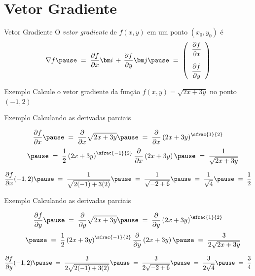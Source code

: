 \section{Vetor Gradiente}

\begin{frame}{Vetor Gradiente}
  O \emph{vetor gradiente} de $f(x, y)$ em um ponto $(x_0, y_0)$
  \pause
  é
  \[
    \nabla f
    \pause
    \;=\; \D{f}{x}\veci \,+\, \D{f}{y}\vecj
    \pause
    \;=\; \left(\begin{array}{c} \D{f}{x} \\[5mm] \D{f}{y} \end{array}\right)
  \]
\end{frame}

\addtocounter{exemplo}{1}
\begin{frame}{Exemplo \theexemplo}
  Calcule o vetor gradiente da função \(f(x, y) = \sqrt{2x+3y}\)
  no ponto \((-1, 2)\)
\end{frame}

\begin{frame}{Exemplo \theexemplo}
  Calculando as derivadas parciais

  \pause
  \[
    \D{f}{x}
    \pause
    \;=\; \D{}{x}\sqrt{2x+3y}
    \pause
    \;=\; \D{}{x}\left(2x+3y\right)^{\sfrac{1}{2}}
  \]
  \[
    \hphantom{\D{f}{x}}
    \pause
    \;=\; \frac{1}{2}\left(2x+3y\right)^{\sfrac{-1}{2}}\D{}{x}\left(2x+3y\right)
    \pause
    \;=\; \frac{1}{\sqrt{2x+3y}}
  \]

  \pause
  \[
    \D{f}{x}(-1, 2)
    \pause
    \;=\; \frac{1}{\sqrt{2(-1)+3(2)}}
    \pause
    \;=\; \frac{1}{\sqrt{-2+6}}
    \pause
    \;=\; \frac{1}{\sqrt{4}}
    \pause
    \;=\; \frac{1}{2}
  \]
\end{frame}

\begin{frame}{Exemplo \theexemplo}
  Calculando as derivadas parciais

  \pause
  \[
    \D{f}{y}
    \pause
    \;=\; \D{}{y}\sqrt{2x+3y}
    \pause
    \;=\; \D{}{y}\left(2x+3y\right)^{\sfrac{1}{2}}
    \]
    \[
    \hphantom{\D{f}{y}}
    \pause
    \;=\; \frac{1}{2}\left(2x+3y\right)^{\sfrac{-1}{2}}\D{}{y}\left(2x+3y\right)
    \pause
    \;=\; \frac{3}{2\sqrt{2x+3y}}
  \]

  \pause
  \[
    \D{f}{y}(-1, 2)
    \pause
    \;=\; \frac{3}{2\sqrt{2(-1)+3(2)}}
    \pause
    \;=\; \frac{3}{2\sqrt{-2+6}}
    \pause
    \;=\; \frac{3}{2\sqrt{4}}
    \pause
    \;=\; \frac{3}{4}
  \]
\end{frame}

